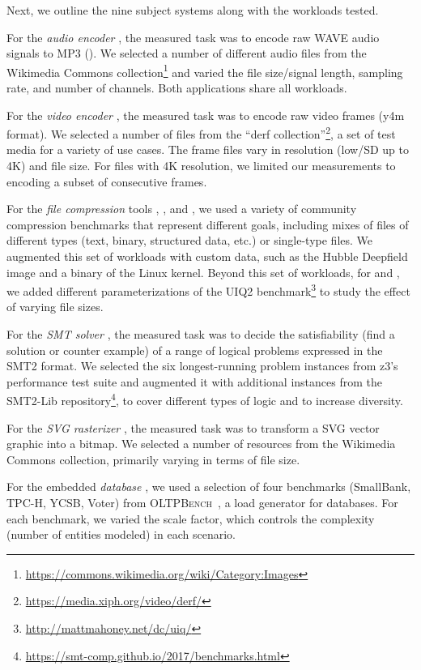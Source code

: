 {{Next, we outline the nine subject systems along with the workloads tested. 

For the \textit{audio encoder} \jumper, the measured task was to encode raw WAVE audio signals to MP3 (\jumper). We selected a number of different audio files from the Wikimedia Commons collection\footnote{\url{https://commons.wikimedia.org/wiki/Category:Images}} and  varied the file size/signal length, sampling rate, and number of channels. Both applications share all workloads.

For the \textit{video encoder} \xzwo, the measured task was to encode raw video frames (y4m format). We selected a number of files from the “derf collection”\footnote{\url{https://media.xiph.org/video/derf/}}, a set of test media for a variety of use cases. The frame files vary in resolution (low/SD up to 4K) and file size. For files with 4K resolution, we limited our measurements to encoding a subset of consecutive frames.

For the \textit{file compression} tools \kanzi, \xz, and \lrzip, we used a variety of community compression benchmarks that represent different goals, including mixes of files of different types (text, binary, structured data, etc.) or single-type files. We augmented this set of workloads with custom data, such as the Hubble Deepfield image and a binary of the Linux kernel. Beyond this set of workloads, for \xz and \lrzip, we added different parameterizations of the UIQ2 benchmark\footnote{\url{http://mattmahoney.net/dc/uiq/}} to study the effect of varying file sizes. 

For the \textit{SMT solver} \zdrei, the measured task was to decide the satisfiability (find a solution or counter example) of a range of logical problems expressed in the SMT2 format. We selected the six longest-running problem instances from z3’s performance test suite and augmented it with additional instances from the SMT2-Lib repository\footnote{\url{https://smt-comp.github.io/2017/benchmarks.html}}, to cover different types of logic and to increase diversity.

For the \textit{SVG rasterizer} \batik, the measured task was to transform a SVG vector graphic into a bitmap. We selected a number of resources from the Wikimedia Commons collection, primarily varying in terms of file size. 

For the embedded \textit{database} \htwo, we used a selection of four benchmarks (SmallBank, TPC-H, YCSB, Voter) from \textsc{OLTPBench}~\cite{difallah_oltp_2013}, a load generator for databases. For each benchmark, we varied the scale factor, which controls the complexity (number of entities modeled) in each scenario.

}}
